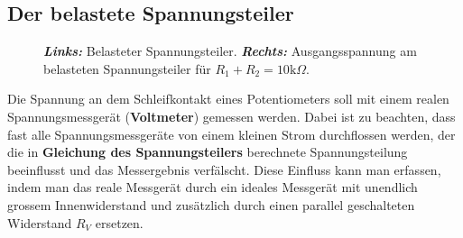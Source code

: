 \subsection{Der belastete Spannungsteiler}
\begin{figure}[H]
\quad
{}
\centering
\caption{\textbf{\textit{Links:}} Belasteter Spannungsteiler. \textbf{\textit{Rechts:}} Ausgangsspannung am belasteten Spannungsteiler für $R_1+R_2=10\text{k}\Omega$.}
\label{fig_IIIp}
\end{figure}
\noindent Die Spannung an dem Schleifkontakt eines Potentiometers soll mit einem realen Spannungsmessgerät (\textbf{Voltmeter}) gemessen werden. Dabei ist zu beachten, dass fast alle Spannungsmessgeräte von einem kleinen Strom durchflossen werden, der die in \textbf{Gleichung des Spannungsteilers} berechnete Spannungsteilung beeinflusst und das Messergebnis verfälscht. Diese Einfluss kann man erfassen, indem man das reale Messgerät durch ein ideales Messgerät mit unendlich grossem Innenwiderstand und zusätzlich durch einen parallel geschalteten Widerstand $R_V$ ersetzen.

